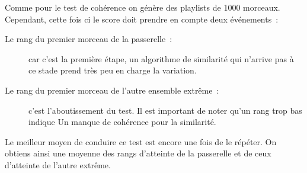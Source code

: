 Comme pour le test de cohérence on génère des playlists de 1000 morceaux.
Cependant, cette fois ci le score doit prendre en compte deux événements~:
\begin{description}
  \item[Le rang du premier morceau de la passerelle~:] car c'est la première
  étape, un algorithme de similarité qui n'arrive pas à ce stade prend très peu
  en charge la variation.
  \item[Le rang du premier morceau de l'autre ensemble extrême~:] c'est
  l'aboutissement du test. Il est important de noter qu'un rang trop bas indique
  Un manque de cohérence pour la similarité.
\end{description}

Le meilleur moyen de conduire ce test est encore une fois de le répéter. On
obtiens ainsi une moyenne des rangs d'atteinte de la passerelle et de ceux
d'atteinte de l'autre extrême.
